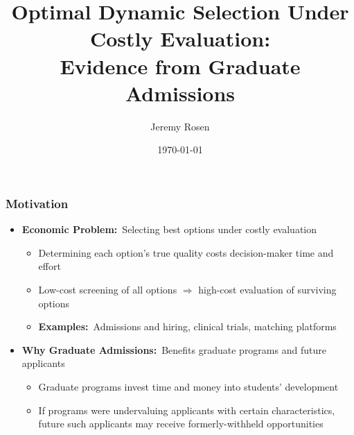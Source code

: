 \documentclass[12pt, aspectratio=169]{beamer}
\title[]{Optimal Dynamic Selection Under Costly Evaluation: \\ Evidence from Graduate Admissions}
\author[]{Jeremy Rosen}
\institute[]{Georgetown University}
\date[]{\today}
\begin{document}
\begin{frame}
\titlepage
\end{frame}

\begin{frame}[label=m]
\frametitle{Motivation}
\begin{itemize}
\item \textbf{Economic Problem:}\ Selecting best options under costly evaluation
\vspace{5pt}
\begin{itemize}
\item Determining each option's true quality costs decision-maker time and effort
\vspace{5pt}
\item Low-cost screening of all options $\Rightarrow$ high-cost evaluation of surviving options
\vspace{5pt}
\item \textbf{Examples:}\ Admissions and hiring, clinical trials, matching platforms
\vspace{10pt}
\end{itemize}
\item \textbf{Why Graduate Admissions:}\ Benefits graduate programs and future applicants
\vspace{5pt}
\begin{itemize}
\item Graduate programs invest time and money into students' development
\vspace{5pt}
\item If programs were undervaluing applicants with certain characteristics, \\ future such applicants may receive formerly-withheld opportunities
\end{itemize}
\end{itemize}
\end{frame}
\end{document}

